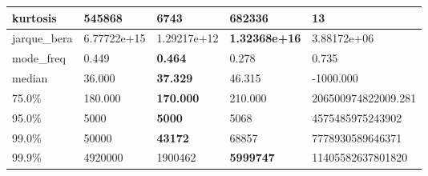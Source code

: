 \begin{table}[H]
\begin{tabular}{|l|m{10em}|m{10em}|m{10em}|m{10em}|}
\hline kurtosis & 545868 & 6743 & \bfseries 682336 & \cellcolor[rgb]{0.9, 0.54, 0.52} 13 \\
\hline jarque\_bera & 6.77722e+15 & 1.29217e+12 & \bfseries 1.32368e+16 & \cellcolor[rgb]{0.9, 0.54, 0.52} 3.88172e+06 \\
\hline mode\_freq & 0.449 & \bfseries 0.464 & 0.278 & \cellcolor[rgb]{0.9, 0.54, 0.52} 0.735 \\
\hline median & 36.000 & \bfseries 37.329 & 46.315 & \cellcolor[rgb]{0.9, 0.54, 0.52} -1000.000 \\
\hline 75.0\% & 180.000 & \bfseries 170.000 & 210.000 & \cellcolor[rgb]{0.9, 0.54, 0.52} 206500974822009.281 \\
\hline 95.0\% & 5000 & \bfseries 5000 & 5068 & \cellcolor[rgb]{0.9, 0.54, 0.52} 4575485975243902 \\
\hline 99.0\% & 50000 & \bfseries 43172 & 68857 & \cellcolor[rgb]{0.9, 0.54, 0.52} 7778930589646371 \\
\hline 99.9\% & 4920000 & 1900462 & \bfseries 5999747 & \cellcolor[rgb]{0.9, 0.54, 0.52} 11405582637801820 \\
\hline
\end{tabular}
\end{table}
